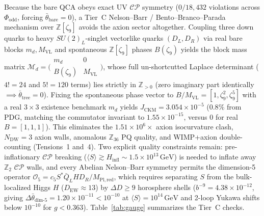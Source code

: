 Because the bare QCA obeys exact UV $\mathcal{CP}$ symmetry ($0/18{,}432$ violations across $\Phi_{\mathrm{odd}}$,
forcing $\bar{\theta}_{\mathrm{bare}} = 0$), a Tier~C Nelson--Barr / Bento--Branco--Parada mechanism
\cite{nelson1984, barr1984, bento1991} over $\mathbb{Z}[\zeta_9]$ avoids the axion sector altogether. Coupling three
down quarks to heavy $SU(2)_L$-singlet vectorlike quarks $(D_L, D_R)$ via real bare blocks $m_d, M_{\mathrm{VL}}$ and
spontaneous $\mathbb{Z}[\zeta_9]$ phases $B(\zeta_9)$ yields the block mass matrix
$\mathcal{M}_d = \bigl(\begin{smallmatrix} m_d & 0 \\ B(\zeta_9) & M_{\mathrm{VL}} \end{smallmatrix}\bigr)$, whose
full un-shortcutted  Laplace determinant ($4! = 24$ and $5! = 120$ terms) lies strictly in
$\mathbb{Z}_{>0}$ (zero imaginary part identically $\implies \bar{\theta}_{\mathrm{tree}} = 0$). Fixing the
spontaneous phase vector to $B / M_{\mathrm{VL}} = [1, \zeta_9^2, \zeta_9^5]$ with a real $3 \times 3$ existence
benchmark $m_d$ yields $J_{\mathrm{CKM}} = 3.054 \times 10^{-5}$ ($0.8\%$ from PDG, matching the commutator invariant to
$1.55 \times 10^{-15}$, versus $0$ for real $B = [1, 1, 1]$). This eliminates the $1.51 \times 10^6\times$ axion
isocurvature clash, $N_{\mathrm{DW}} = 3$ axion walls, anomalous $\mathbb{Z}_{36}$ PQ quality, and WIMP+axion
double-counting (Tensions~1 and~4). Two explicit quality constraints remain: pre-inflationary $\mathcal{CP}$ breaking
($\langle S \rangle \gtrsim H_{\mathrm{infl}} \sim 1.5 \times 10^{13}\,\mathrm{GeV}$) is needed to inflate away
$\mathbb{Z}_2$ $\mathcal{CP}$ walls, and every Abelian Nelson--Barr symmetry permits the dimension-5 operator
$\mathcal{O}_5 = c_5 S^* \bar{Q}_L H D_R / M_{\mathrm{Pl,red}}$, which requires separating $S$ from the bulk-localized
Higgs $H$ ($D_{\mathrm{EW}} \approx 13$) by $\Delta D \ge 9$ horosphere shells ($b^{-9} = 4.38 \times 10^{-12}$, giving
$\Delta\bar{\theta}_{\mathrm{dim\text{-}5}} = 1.20 \times 10^{-11} < 10^{-10}$ at $\langle S \rangle = 10^{14}\,\mathrm{GeV}$
and 2-loop Yukawa shifts below $10^{-10}$ for $g < 0.363$). Table~\ref{tab:gauge} summarizes the Tier~C checks.


